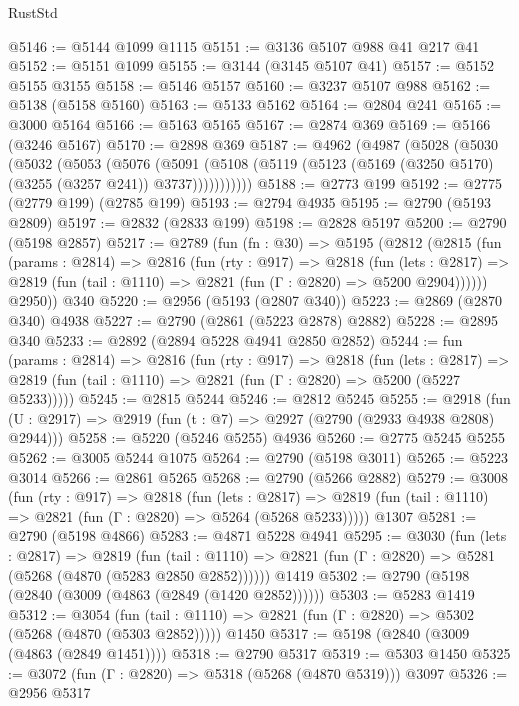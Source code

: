 \begin{lexlean}{RustStd}
\begin{coremodule}
{\begin{coremodule}
{{{{{{{{{{{{{{{{{{{{{{{{{{@5146 := @5144 @1099 @1115
@5151 := @3136 @5107 @988 @41 @217 @41
@5152 := @5151 @1099
@5155 := @3144 (@3145 @5107 @41)
@5157 := @5152 @5155 @3155
@5158 := @5146 @5157
@5160 := @3237 @5107 @988
@5162 := @5138 (@5158 @5160)
@5163 := @5133 @5162
@5164 := @2804 @241
@5165 := @3000 @5164
@5166 := @5163 @5165
@5167 := @2874 @369
@5169 := @5166 (@3246 @5167)
@5170 := @2898 @369
@5187 := @4962
    (@4987
      (@5028
        (@5030
          (@5032
            (@5053
              (@5076
                (@5091
                  (@5108 (@5119 (@5123 (@5169 (@3250 @5170) (@3255 (@3257 @241)) @3737)))))))))))
@5188 := @2773 @199
@5192 := @2775 (@2779 @199) (@2785 @199)
@5193 := @2794 @4935
@5195 := @2790 (@5193 @2809)
@5197 := @2832 (@2833 @199)
@5198 := @2828 @5197
@5200 := @2790 (@5198 @2857)
@5217 := @2789
    (fun (fn : @30) =>
    @5195
      (@2812
        (@2815
          (fun (params : @2814) =>
          @2816
            (fun (rty : @917) =>
            @2818
              (fun (lets : @2817) =>
              @2819 (fun (tail : @1110) => @2821 (fun (Γ : @2820) => @5200 @2904))))))
        @2950))
    @340
@5220 := @2956 (@5193 (@2807 @340))
@5223 := @2869 (@2870 @340) @4938
@5227 := @2790 (@2861 (@5223 @2878) @2882)
@5228 := @2895 @340
@5233 := @2892 (@2894 @5228 @4941 @2850 @2852)
@5244 := fun (params : @2814) =>
  @2816
    (fun (rty : @917) =>
    @2818
      (fun (lets : @2817) =>
      @2819 (fun (tail : @1110) => @2821 (fun (Γ : @2820) => @5200 (@5227 @5233)))))
@5245 := @2815 @5244
@5246 := @2812 @5245
@5255 := @2918 (fun (U : @2917) => @2919 (fun (t : @7) => @2927 (@2790 (@2933 @4938 @2808) @2944)))
@5258 := @5220 (@5246 @5255) @4936
@5260 := @2775 @5245 @5255
@5262 := @3005 @5244 @1075
@5264 := @2790 (@5198 @3011)
@5265 := @5223 @3014
@5266 := @2861 @5265
@5268 := @2790 (@5266 @2882)
@5279 := @3008
    (fun (rty : @917) =>
    @2818
      (fun (lets : @2817) =>
      @2819 (fun (tail : @1110) => @2821 (fun (Γ : @2820) => @5264 (@5268 @5233)))))
    @1307
@5281 := @2790 (@5198 @4866)
@5283 := @4871 @5228 @4941
@5295 := @3030
    (fun (lets : @2817) =>
    @2819
      (fun (tail : @1110) => @2821 (fun (Γ : @2820) => @5281 (@5268 (@4870 (@5283 @2850 @2852))))))
    @1419
@5302 := @2790 (@5198 (@2840 (@3009 (@4863 (@2849 (@1420 @2852))))))
@5303 := @5283 @1419
@5312 := @3054
    (fun (tail : @1110) => @2821 (fun (Γ : @2820) => @5302 (@5268 (@4870 (@5303 @2852)))))
    @1450
@5317 := @5198 (@2840 (@3009 (@4863 (@2849 @1451))))
@5318 := @2790 @5317
@5319 := @5303 @1450
@5325 := @3072 (fun (Γ : @2820) => @5318 (@5268 (@4870 @5319))) @3097
@5326 := @2956 @5317
}}}}}}}}}}}}}}}}}}}}}}}}}}
\end{coremodule}}
\end{coremodule}
\end{lexlean}
